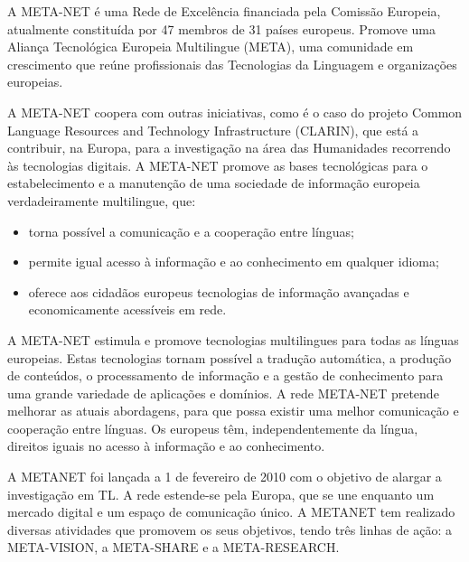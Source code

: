 \begin{multicols}{2}

 A META-NET é uma Rede de Excelência financiada pela Comissão Europeia, atualmente constituída por 47 membros de 31 países europeus. Promove uma Aliança Tecnológica Europeia Multilingue (META), uma comunidade em crescimento que reúne profissionais das Tecnologias da Linguagem e organizações europeias.

A META-NET coopera com outras iniciativas, como é o caso do projeto Common Language Resources and Technology Infrastructure (CLARIN), que está a contribuir, na Europa, para a investigação na área das Humanidades recorrendo às tecnologias digitais. A META-NET promove as bases tecnológicas para o estabelecimento e a manutenção de uma sociedade de informação europeia verdadeiramente multilingue, que:

\begin{itemize}
    \item torna possível a comunicação e a cooperação entre línguas;
      \item permite igual acesso à informação e ao conhecimento em qualquer idioma;
      \item oferece aos cidadãos europeus tecnologias de informação avançadas e economicamente acessíveis em rede.
\end{itemize}

A META-NET estimula e promove tecnologias multilingues para todas as línguas europeias. Estas tecnologias tornam possível a tradução automática, a produção de conteúdos, o processamento de informação e a gestão de conhecimento para uma grande variedade de aplicações e domínios. A rede META-NET pretende melhorar as atuais abordagens, para que possa existir uma melhor comunicação e cooperação entre línguas. Os europeus têm, independentemente da língua, direitos iguais no acesso à informação e ao conhecimento. 

 A METANET foi lançada a 1 de fevereiro de 2010 com o objetivo de alargar a investigação em TL. A rede estende-se pela Europa, que se une enquanto um mercado digital e um espaço de comunicação único. A METANET tem realizado diversas atividades que promovem os seus objetivos, tendo três linhas de ação: a META-VISION, a META-SHARE e a META-RESEARCH.


\end{multicols}
